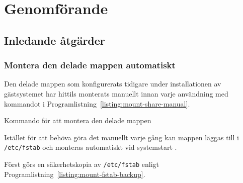 %
%
%


\section{Genomförande}




\subsection{Inledande åtgärder}

\subsubsection{Montera den delade mappen automatiskt}
Den delade mappen som konfigurerats tidigare under installationen av
gästsystemet har hittils monterats manuellt innan varje användning med
kommandot i Programlistning~\ref{listing:mount-share-manual}.

\begin{listing}[H]
  \caption{Kommando för att montera den delade mappen}
  \label{listing:mount-share-manual}
\end{listing}

Istället för att behöva göra det manuellt varje gång kan mappen läggas till i
\texttt{/etc/fstab} och monteras automatiskt vid systemstart
\cite{virtualbox:sharemount}.

Först görs en säkerhetskopia av \texttt{/etc/fstab} enligt
Programlistning~\ref{listing:mount-fstab-backup}.





